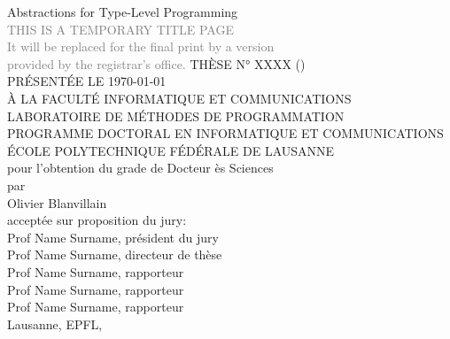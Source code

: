 \begin{titlepage}
\begin{center}
\sffamily
\null\vspace{2cm}
\huge Abstractions for Type-Level Programming\\[24pt]
\textcolor{gray}{\small THIS IS A TEMPORARY TITLE PAGE\\
It will be replaced for the final print by a version\\[-14pt]
provided by the registrar's office.}
\vfill
\normalsize THÈSE N° XXXX (\the\year)\\[10pt]
PRÉSENTÉE LE \uppercase{\today}\\
À LA FACULTÉ INFORMATIQUE ET COMMUNICATIONS\\
LABORATOIRE DE MÉTHODES DE PROGRAMMATION\\
PROGRAMME DOCTORAL EN INFORMATIQUE ET COMMUNICATIONS\\[10pt]
ÉCOLE POLYTECHNIQUE FÉDÉRALE DE LAUSANNE\\
pour l'obtention du grade de Docteur ès Sciences\\
par\\[20pt]
\Large Olivier Blanvillain\\[20pt]
\small acceptée sur proposition du jury:\\[4pt]
Prof Name Surname, président du jury\\
Prof Name Surname, directeur de thèse\\
Prof Name Surname, rapporteur\\
Prof Name Surname, rapporteur\\
Prof Name Surname, rapporteur\\[12pt]
Lausanne, EPFL, \the\year
\end{center}
\vspace{2cm}
\end{titlepage}
